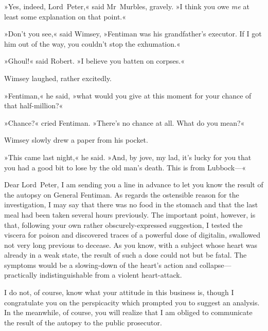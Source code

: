 »Yes, indeed, Lord~Peter,« said Mr~Murbles, gravely. »I think you owe \textit{me} at least some explanation on that point.«

»Don't you see,« said Wimsey, »Fentiman was his grandfather's executor. If I got him out of the way, you couldn't stop the exhumation.«

»Ghoul!« said Robert. »I believe you batten on corpses.«

Wimsey laughed, rather excitedly.

»Fentiman,« he said, »what would you give at this moment for your chance of that half-million?«

»Chance?« cried Fentiman. »There's no chance at all. What do you mean?«

Wimsey slowly drew a paper from his pocket.

»This came last night,« he said. »And, by jove, my lad, it's lucky for you that you had a good bit to lose by the old man's death. This is from Lubbock—«

\begin{mail}{}{Dear Lord~Peter,}
	I am sending you a line in advance to let you know the result of the autopsy on General Fentiman. As regards the ostensible reason for the investigation, I may say that there was no food in the stomach and that the last meal had been taken several hours previously. The important point, however, is that, following your own rather obscurely-expressed suggestion, I tested the viscera for poison and discovered traces of a powerful dose of digitalin, swallowed not very long previous to decease. As you know, with a subject whose heart was already in a weak state, the result of such a dose could not but be fatal. The symptoms would be a slowing-down of the heart's action and collapse—practically indistinguishable from a violent heart-attack.

I do not, of course, know what your attitude in this business is, though I congratulate you on the perspicacity which prompted you to suggest an analysis. In the meanwhile, of course, you will realize that I am obliged to communicate the result of the autopsy to the public prosecutor.
\end{mail}



